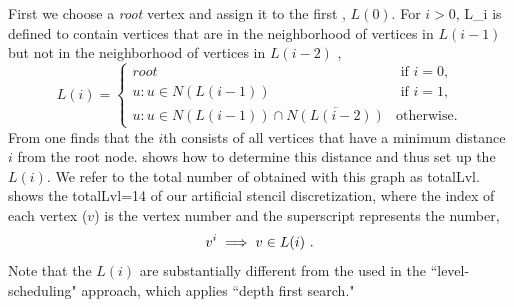 First we choose a \emph{root} vertex and assign it to the
first \level, $L(0)$\@. For $i>0$, \level \acrshort{L_i}
is defined to contain vertices that are in the neighborhood of vertices
in $L(i-1)$ but not in the neighborhood of vertices
in $L(i-2)$ \cite{BFS_level_def}, \ie
\begin{equation}\label{eq:level}
L(i) = 
\begin{cases}
	 root & \text{ if } i = 0, \\
	 u : u \in N(L(i-1))  & \text{ if } i = 1, \\
	 u : u \in N(L(i-1)) \cap \overline{N(L(i-2))}  & \text{otherwise}.
\end{cases}   
\end{equation}
From  one finds that the $i$th \level consists of all
vertices that have a minimum distance $i$ from the root node.
 shows how to determine this distance and thus set up the
\levels $L(i)$\@. We refer to the total number of \levels obtained with this graph
as \acrshort{totalLvl}.  shows the
\acrshort{totalLvl}=14 \levels of our artificial stencil
discretization, where the index of each vertex ($v$) is the
vertex number and the superscript represents the \level number, \ie
\begin{equation}\label{eq:node_notation}
	v^i \implies v \in L(i)~.
\end{equation}
Note that the $L(i)$ are  substantially different from the \levels used in
the ``level-scheduling" \cite{saad} approach, which applies ``depth first
search."

\setlength{\fboxsep}{0pt}%

